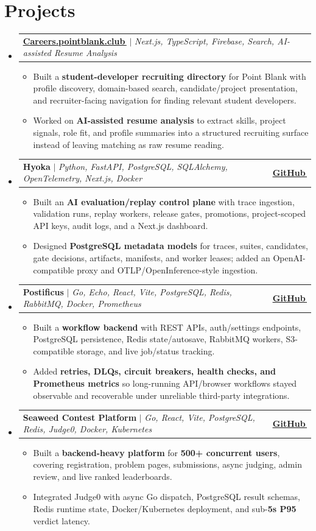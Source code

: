 \documentclass[letterpaper,11pt]{article}
\makeatletter
\newcommand{\bodyhref}[2]{\href{#1}{\underline{#2}\,\faExternalLink*}}
\newcommand{\resumeItem}[1]{\item{\fontsize{9.05pt}{9.75pt}\selectfont #1\vspace{-0.7pt}}}
\newcommand{\resumeProjectHeading}[2]{
    \item
    \begin{tabular*}{1.001\textwidth}{l@{\extracolsep{\fill}}r}
      \small#1 & \textbf{\small #2}\\
    \end{tabular*}\vspace{-4pt}
}
\newcommand{\resumeSubHeadingListStart}{\begin{itemize}[leftmargin=0.0in, label={}, itemsep=0.6pt, topsep=0pt, parsep=0pt, partopsep=0pt]}
\newcommand{\resumeSubHeadingListEnd}{\end{itemize}}
\newcommand{\resumeItemListStart}{\begin{itemize}[leftmargin=0.16in,itemsep=0.3pt,topsep=0.9pt,parsep=0pt,partopsep=0pt]}
\newcommand{\resumeItemListEnd}{\end{itemize}\vspace{-3pt}}
\makeatother
\begin{document}
\section{Projects}
\resumeSubHeadingListStart
\resumeProjectHeading
{\textbf{\bodyhref{https://careers.pointblank.club/}{Careers.pointblank.club}} $|$ \emph{Next.js, TypeScript, Firebase, Search, AI-assisted Resume Analysis}}{}
\resumeItemListStart
\resumeItem{Built a \textbf{student-developer recruiting directory} for Point Blank with profile discovery, domain-based search, candidate/project presentation, and recruiter-facing navigation for finding relevant student developers.}
\resumeItem{Worked on \textbf{AI-assisted resume analysis} to extract skills, project signals, role fit, and profile summaries into a structured recruiting surface instead of leaving matching as raw resume reading.}
\resumeItemListEnd
\resumeProjectHeading
{\textbf{Hyoka} $|$ \emph{Python, FastAPI, PostgreSQL, SQLAlchemy, OpenTelemetry, Next.js, Docker}}{\bodyhref{https://github.com/unichronic/hyoka}{GitHub}}
\resumeItemListStart
\resumeItem{Built an \textbf{AI evaluation/replay control plane} with trace ingestion, validation runs, replay workers, release gates, promotions, project-scoped API keys, audit logs, and a Next.js dashboard.}
\resumeItem{Designed \textbf{PostgreSQL metadata models} for traces, suites, candidates, gate decisions, artifacts, manifests, and worker leases; added an OpenAI-compatible proxy and OTLP/OpenInference-style ingestion.}
\resumeItemListEnd
\resumeProjectHeading
{\textbf{Postificus} $|$ \emph{Go, Echo, React, Vite, PostgreSQL, Redis, RabbitMQ, Docker, Prometheus}}{\bodyhref{https://github.com/unichronic/postificus}{GitHub}}
\resumeItemListStart
\resumeItem{Built a \textbf{workflow backend} with REST APIs, auth/settings endpoints, PostgreSQL persistence, Redis state/autosave, RabbitMQ workers, S3-compatible storage, and live job/status tracking.}
\resumeItem{Added \textbf{retries, DLQs, circuit breakers, health checks, and Prometheus metrics} so long-running API/browser workflows stayed observable and recoverable under unreliable third-party integrations.}
\resumeItemListEnd
\resumeProjectHeading
{\textbf{Seaweed Contest Platform} $|$ \emph{Go, React, Vite, PostgreSQL, Redis, Judge0, Docker, Kubernetes}}{\bodyhref{https://github.com/unichronic/seaweed-fe}{GitHub}}
\resumeItemListStart
\resumeItem{Built a \textbf{backend-heavy platform} for \textbf{500+ concurrent users}, covering registration, problem pages, submissions, async judging, admin review, and live ranked leaderboards.}
\resumeItem{Integrated Judge0 with async Go dispatch, PostgreSQL result schemas, Redis runtime state, Docker/Kubernetes deployment, and sub-\textbf{5s P95} verdict latency.}
\resumeItemListEnd
\resumeSubHeadingListEnd
\end{document}
